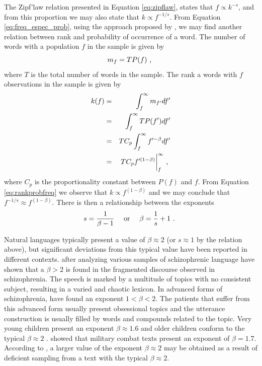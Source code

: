 The Zipf'law relation presented in Equation \ref{eq:zipflaw}, states that $f \propto k^{-s}$, and from
this proportion we may also state that $k \propto f^{-1/s}$. From Equation \ref{eq:freq_espec_prob},
using the approach proposed by \cite{}, we may find another relation between rank and probability of
occurrence of a word. The number of words with a population $f$ in the sample is given by
\begin{equation}
m_f = T P(f)   \textmd{ , }
\end{equation} 
where $T$ is the total number of words in the sample. The rank a words with $f$ observations in the sample
is given by 
\begin{eqnarray}
\label{eq:rankprobfreq}
k(f) &=& \int_f^{\infty} m_{f'} df' \nonumber \\ 
     &=& \int_f^{\infty} T P(f') df' \nonumber \\
     &=& T C_p \int_f^{\infty} f'^{-\beta} df' \nonumber \\
     &=& T C_p f'^{(1-\beta)} \biggr|_f^\infty \textmd{ , }
\end{eqnarray}
where $C_p$ is the proportionality constant between $P(f)$ and $f$.
From Equation \ref{eq:rankprobfreq} we observe that $k \propto f^{(1-\beta)}$ and 
we may conclude that $f^{-1/s} \approx f^{(1-\beta)}$. There is then a relationship between the 
exponents
\begin{equation}
s = \frac{1}{\beta - 1} \quad  \textmd{ or } \quad \beta = \frac{1}{s} + 1 \textmd{ . }
\end{equation}

Natural languages typically present a value of $\beta \approx 2$ (or $s \approx 1$ by the relation above), 
but significant deviations from this typical value have been reported
in different contexts. \cite{piotrovskii} after analyzing various samples of schizophrenic language
have shown that a $\beta > 2$ is found in the fragmented discourse observed in schizophrenia.
The speech is marked by a multitude of topics with no consistent subject, resulting in a varied
and chaotic lexicon. In advanced forms of schizophrenia, \cite{piotrovskii} have found an exponent
$1 < \beta < 2$. The patients that suffer from this advanced form usually present obsessional topics
and the utterance construction is usually filled by words and compounds related to the topic.
Very young children present an exponent $\beta \approx 1.6$ \citep{piotrovskii} and older children conform to 
the typical $\beta \approx 2$ \citep{zipf1942}. \cite{kolguskin1960} showed that military combat texts present 
an exponent of $\beta = 1.7$. According to \cite{piotrovskii}, a larger value of the exponent $\beta \approx 2$
may be obtained as a result of deficient sampling from a text with the typical $\beta \approx 2$.

